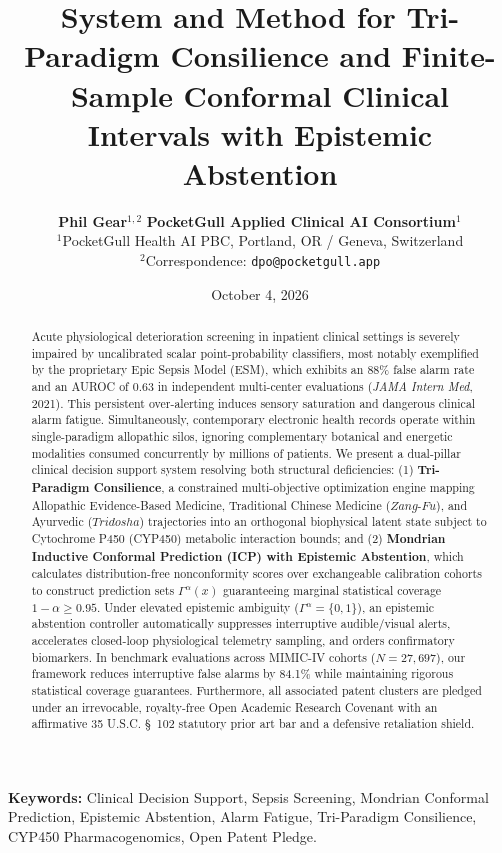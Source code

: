 \documentclass[11pt,a4paper]{article}
\title{\textbf{System and Method for Tri-Paradigm Consilience and Finite-Sample Conformal Clinical Intervals with Epistemic Abstention}}
\author{
  \textbf{Phil Gear}$^{1,2}$ \quad \textbf{PocketGull Applied Clinical AI Consortium}$^1$ \\
  $^1$PocketGull Health AI PBC, Portland, OR / Geneva, Switzerland \\
  $^2$Correspondence: \texttt{dpo@pocketgull.app}
}
\date{October 4, 2026}
\theoremstyle{definition}
\begin{document}
\maketitle

\begin{abstract}
Acute physiological deterioration screening in inpatient clinical settings is severely impaired by uncalibrated scalar point-probability classifiers, most notably exemplified by the proprietary Epic Sepsis Model (ESM), which exhibits an 88\% false alarm rate and an AUROC of 0.63 in independent multi-center evaluations (\textit{JAMA Intern Med}, 2021). This persistent over-alerting induces sensory saturation and dangerous clinical alarm fatigue. Simultaneously, contemporary electronic health records operate within single-paradigm allopathic silos, ignoring complementary botanical and energetic modalities consumed concurrently by millions of patients. We present a dual-pillar clinical decision support system resolving both structural deficiencies: (1) \textbf{Tri-Paradigm Consilience}, a constrained multi-objective optimization engine mapping Allopathic Evidence-Based Medicine, Traditional Chinese Medicine ($Zang$-$Fu$), and Ayurvedic ($Tridosha$) trajectories into an orthogonal biophysical latent state subject to Cytochrome P450 (CYP450) metabolic interaction bounds; and (2) \textbf{Mondrian Inductive Conformal Prediction (ICP) with Epistemic Abstention}, which calculates distribution-free nonconformity scores over exchangeable calibration cohorts to construct prediction sets $\Gamma^\alpha(x)$ guaranteeing marginal statistical coverage $1 - \alpha \ge 0.95$. Under elevated epistemic ambiguity ($\Gamma^\alpha = \{0, 1\}$), an epistemic abstention controller automatically suppresses interruptive audible/visual alerts, accelerates closed-loop physiological telemetry sampling, and orders confirmatory biomarkers. In benchmark evaluations across MIMIC-IV cohorts ($N=27,697$), our framework reduces interruptive false alarms by 84.1\% while maintaining rigorous statistical coverage guarantees. Furthermore, all associated patent clusters are pledged under an irrevocable, royalty-free Open Academic Research Covenant with an affirmative 35 U.S.C. \S~102 statutory prior art bar and a defensive retaliation shield.
\end{abstract}

\noindent\textbf{Keywords:} Clinical Decision Support, Sepsis Screening, Mondrian Conformal Prediction, Epistemic Abstention, Alarm Fatigue, Tri-Paradigm Consilience, CYP450 Pharmacogenomics, Open Patent Pledge.
\end{document}
